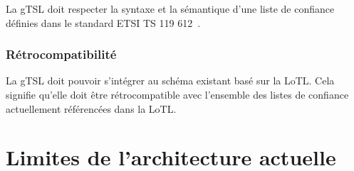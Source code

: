 \documentclass{tnreport}
\begin{document}
La gTSL doit respecter la syntaxe et la sémantique d'une liste de confiance définies dans le standard ETSI TS 119 612~\cite{ETSITS119612}.

\subsubsection{Rétrocompatibilité}

La gTSL doit pouvoir s'intégrer au schéma existant basé sur la LoTL. Cela signifie qu'elle doit être rétrocompatible avec l'ensemble des listes de confiance actuellement référencées dans la LoTL.

\section{Limites de l'architecture actuelle}
\label{sec:limits}
\end{document}
